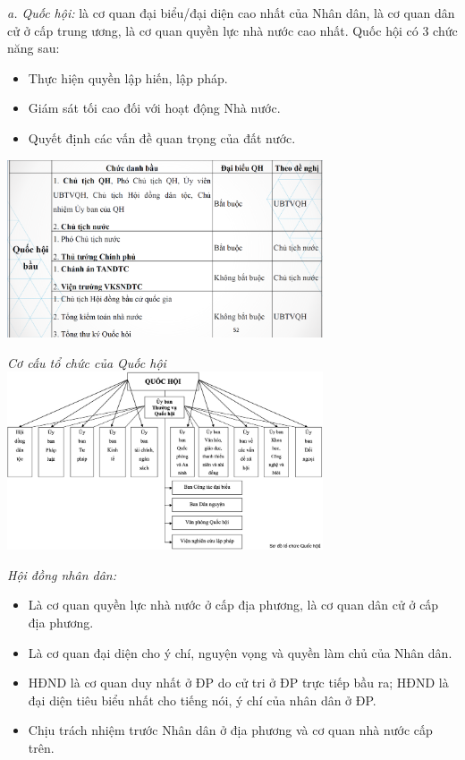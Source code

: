 \documentclass[12pt, a4paper]{article}
\begin{document}
\textit{a. Quốc hội:} là cơ quan đại biểu/đại diện cao nhất của Nhân dân, là cơ quan dân cử ở cấp trung ương, là cơ quan quyền lực nhà nước cao nhất. Quốc hội có 3 chức năng sau:
\begin{itemize}
  \item Thực hiện quyền lập hiến, lập pháp.
  \item Giám sát tối cao đối với hoạt động Nhà nước.
  \item Quyết định các vấn đề quan trọng của đất nước.
\end{itemize}
\begin{center}
  \includegraphics[width = 0.7\textwidth]{./image/4.png}
\end{center}
\begin{center}
  \textit{Cơ cấu tổ chức của Quốc hội}\\
  \includegraphics[width = 0.7\textwidth]{./image/5.png}
\end{center}

\textit{Hội đồng nhân dân:}
\begin{itemize}
  \item Là cơ quan quyền lực nhà nước ở cấp địa phương, là cơ quan dân cử ở cấp địa phương.
  \item Là cơ quan đại diện cho ý chí, nguyện vọng và quyền làm chủ của Nhân dân.
  \item HĐND là cơ quan duy nhất ở ĐP do cử tri ở ĐP trực tiếp bầu ra; HĐND là đại diện tiêu biểu nhất cho tiếng nói, ý chí của nhân dân ở ĐP.
  \item Chịu trách nhiệm trước Nhân dân ở địa phương và cơ quan nhà nước cấp trên.
\end{itemize}  
\end{document}
